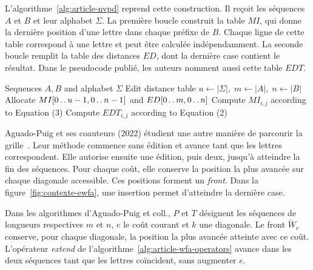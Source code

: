 L’algorithme~\ref{alg:article-nvpd} reprend cette construction. Il reçoit les séquences \(A\) et \(B\) et leur alphabet \(\Sigma\). La première boucle construit la table \(MI\), qui donne la dernière position d’une lettre dans chaque préfixe de \(B\). Chaque ligne de cette table correspond à une lettre et peut être calculée indépendamment. La seconde boucle remplit la table des distances \(ED\), dont la dernière case contient le résultat. Dans le pseudocode publié, les auteurs nomment aussi cette table \(EDT\).
\begin{algorithm}[!htbp]
\caption{NvPD de Sadiq et coll., numéros des équations rectifiés~\cite[alg.~1, p.~885]{sadiq}}\label{alg:article-nvpd}
\small
\begin{algorithmic}[1]
\Require Sequences \(A,B\) and alphabet \(\Sigma\)
\Ensure Edit distance table
\State \(u\gets|\Sigma|,\; m\gets|A|,\; n\gets|B|\)
\State Allocate \(MI[0\mathinner{\ldotp\ldotp}u-1,0\mathinner{\ldotp\ldotp}n-1]\) and \(ED[0\mathinner{\ldotp\ldotp}m,0\mathinner{\ldotp\ldotp}n]\)
   \State Compute \(MI_{i,j}\) according to Equation (3) \EndFor
\EndFor
{}
   \State Compute \(EDT_{i,j}\) according to Equation (2) \EndFor
\EndFor
\end{algorithmic}
\end{algorithm}

Aguado-Puig et ses coauteurs (2022) étudient une autre manière de parcourir la grille~\cite{wfagpu}. Leur méthode commence sans édition et avance tant que les lettres correspondent. Elle autorise ensuite une édition, puis deux, jusqu’à atteindre la fin des séquences. Pour chaque coût, elle conserve la position la plus avancée sur chaque diagonale accessible. Ces positions forment un \emph{front}. Dans la figure~\ref{fig:contexte-ewfa}, une insertion permet d’atteindre la dernière case.


Dans les algorithmes d’Aguado-Puig et coll., \(P\) et \(T\) désignent les séquences de longueurs respectives \(m\) et \(n\), \(e\) le coût courant et \(k\) une diagonale. Le front \(\widetilde W_e\) conserve, pour chaque diagonale, la position la plus avancée atteinte avec ce coût. L’opérateur \textit{extend} de l’algorithme~\ref{alg:article-wfa-operators} avance dans les deux séquences tant que les lettres coïncident, sans augmenter \(e\).

